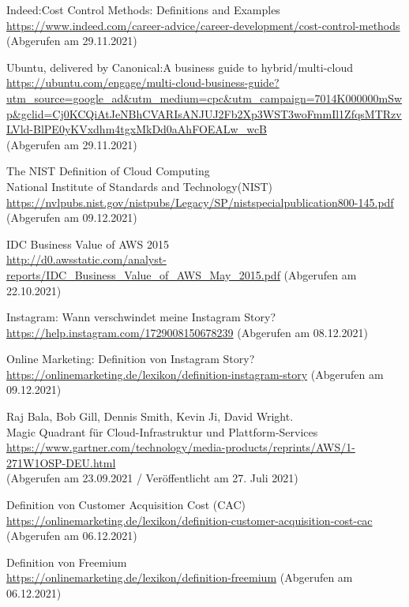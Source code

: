 \begin{thebibliography}{HR08}
 Indeed:Cost Control Methods: Definitions and Examples\\
  \url{https://www.indeed.com/career-advice/career-development/cost-control-methods}\\
  (Abgerufen am 29.11.2021)

   Ubuntu, delivered by Canonical:A business guide to hybrid/multi-cloud\\
  \url{https://ubuntu.com/engage/multi-cloud-business-guide?utm_source=google_ad&utm_medium=cpc&utm_campaign=7014K000000mSwp&gclid=Cj0KCQiAtJeNBhCVARIsANJUJ2Fb2Xp3WST3woFmmIl1ZfqsMTRzvLVld-BlPE0yKVxdhm4tgxMkDd0aAhFOEALw_wcB}\\
  (Abgerufen am 29.11.2021)

  The NIST Definition of Cloud Computing\\
  National Institute of Standards and Technology(NIST)
  \url{https://nvlpubs.nist.gov/nistpubs/Legacy/SP/nistspecialpublication800-145.pdf}\\
  (Abgerufen am 09.12.2021)

   IDC Business Value of AWS 2015\\
 \url{http://d0.awsstatic.com/analyst-reports/IDC_Business_Value_of_AWS_May_2015.pdf}
 (Abgerufen am 22.10.2021)

   Instagram: Wann verschwindet meine Instagram Story?\\
 \url{https://help.instagram.com/1729008150678239}
 (Abgerufen am 08.12.2021)

  Online Marketing: Definition von Instagram Story?\\
 \url{https://onlinemarketing.de/lexikon/definition-instagram-story}
 (Abgerufen am 09.12.2021)

 Raj Bala, Bob Gill, Dennis Smith, Kevin Ji, David Wright.\\ 
  Magic Quadrant für Cloud-Infrastruktur und Plattform-Services\\
  \url{https://www.gartner.com/technology/media-products/reprints/AWS/1-271W1OSP-DEU.html}
  \\(Abgerufen am 23.09.2021 / Veröffentlicht am 27. Juli 2021)

 Definition von Customer Acquisition Cost (CAC)\\
 \url{https://onlinemarketing.de/lexikon/definition-customer-acquisition-cost-cac}
 (Abgerufen am 06.12.2021)

  Definition von Freemium\\
 \url{https://onlinemarketing.de/lexikon/definition-freemium}
 (Abgerufen am 06.12.2021)
  

\end{thebibliography}

